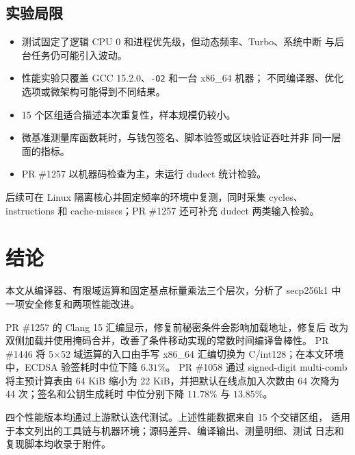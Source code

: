\documentclass[UTF8,a4paper,zihao=-4]{ctexart}
\begin{document}
\subsection{实验局限}

\begin{itemize}
  \item 测试固定了逻辑 CPU 0 和进程优先级，但动态频率、Turbo、系统中断
  与后台任务仍可能引入波动。
  \item 性能实验只覆盖 GCC 15.2.0、\texttt{-O2} 和一台 x86\_64 机器；
  不同编译器、优化选项或微架构可能得到不同结果。
  \item 15 个区组适合描述本次重复性，样本规模仍较小。
  \item 微基准测量库函数耗时，与钱包签名、脚本验签或区块验证吞吐并非
  同一层面的指标。
  \item PR \#1257 以机器码检查为主，未运行 dudect 统计检验\cite{dudect}。
\end{itemize}

后续可在 Linux 隔离核心并固定频率的环境中复测，同时采集 cycles、
instructions 和 cache-misses；PR \#1257 还可补充 dudect 两类输入检验。

\section{结论}

本文从编译器、有限域运算和固定基点标量乘法三个层次，分析了
secp256k1 中一项安全修复和两项性能改进。

PR \#1257 的 Clang 15 汇编显示，修复前秘密条件会影响加载地址，修复后
改为双侧加载并使用掩码合并，改善了条件移动实现的常数时间编译鲁棒性。
PR \#1446 将 5$\times$52 域运算的入口由手写 x86\_64 汇编切换为
C/int128；在本文环境中，ECDSA 验签耗时中位下降 $6.31\%$。
PR \#1058 通过 signed-digit multi-comb 将主预计算表由 64 KiB 缩小为
22 KiB，并把默认在线点加入次数由 64 次降为 44 次；签名和公钥生成耗时
中位分别下降 $11.78\%$ 与 $13.85\%$。

四个性能版本均通过上游默认迭代测试。上述性能数据来自 15 个交错区组，
适用于本文列出的工具链与机器环境；源码差异、编译输出、测量明细、测试
日志和复现脚本均收录于附件。
\end{document}
